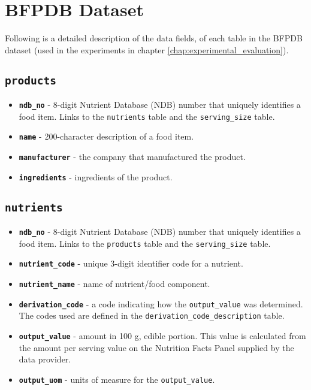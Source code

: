 \chapter{BFPDB Dataset}
\label{appendix:bfpdb_schema}

Following is a detailed description of the data fields, of each table in the BFPDB dataset (used in the experiments in chapter \ref{chap:experimental_evaluation}).

\section{\texttt{products}}\label{appendix:sec:products}
\begin{itemize}
    \item \textbf{\texttt{ndb\_no}} - 8-digit Nutrient Database (NDB) number that uniquely identifies a food item. Links to the \texttt{nutrients} table and the \texttt{serving\_size} table.
    \item \textbf{\texttt{name}} - 200-character description of a food item.
    \item \textbf{\texttt{manufacturer}} - the company that manufactured the product.
    \item \textbf{\texttt{ingredients}} - ingredients of the product.
\end{itemize}
% 

\section{\texttt{nutrients}}\label{appendix:sec:nutrients}
\begin{itemize}
    \item \textbf{\texttt{ndb\_no}} - 8-digit Nutrient Database (NDB) number that uniquely identifies a food item. Links to the \texttt{products} table and the \texttt{serving\_size} table.
    \item \textbf{\texttt{nutrient\_code}} - unique 3-digit identifier code for a nutrient.
    \item \textbf{\texttt{nutrient\_name}} - name of nutrient/food component.
    \item \textbf{\texttt{derivation\_code}} - a code indicating how the \texttt{output\_value} was determined. The codes used are defined in the \texttt{derivation\_code\_description} table.
    \item \textbf{\texttt{output\_value}} - amount in 100 g, edible portion. This value is calculated from the amount per serving value on the Nutrition Facts Panel supplied by the data provider.
    \item \textbf{\texttt{output\_uom}} - units of measure for the \texttt{output\_value}.
\end{itemize}
% 


